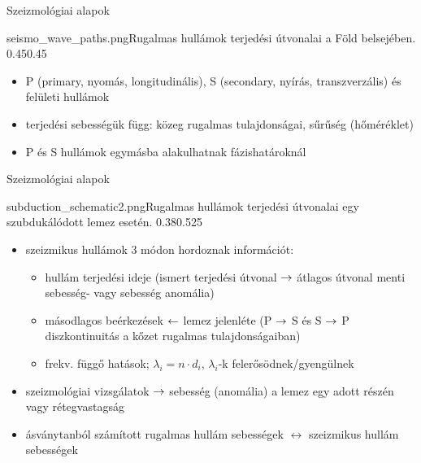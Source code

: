 \documentclass{beamer}
\begin{document}
\begin{frame}{Szeizmológiai alapok}
    \begin{figp}{seismo_wave_paths.png}{Rugalmas hullámok terjedési útvonalai a Föld belsejében. \cite{wysession}}{0.45}{0.45}
        \begin{itemize}
            \item P (primary, nyomás, longitudinális), S (secondary, nyírás, transzverzális) és felületi hullámok
            \item terjedési sebességük függ: közeg rugalmas tulajdonságai, sűrűség (hőméréklet)
            \item P és S hullámok egymásba alakulhatnak fázishatároknál
        \end{itemize}
    \end{figp}
\end{frame}


\begin{frame}{Szeizmológiai alapok}
    \begin{figp}{subduction_schematic2.png}{Rugalmas hullámok terjedési útvonalai egy szubdukálódott lemez esetén. \cite{helffrich}}{0.38}{0.525}
        \begin{itemize}
            \item szeizmikus hullámok 3 módon hordoznak információt:
            \begin{itemize}
                \item hullám terjedési ideje (ismert terjedési útvonal $\rightarrow$ átlagos útvonal menti sebesség- vagy sebesség anomália)
                \item másodlagos beérkezések $\leftarrow$ lemez jelenléte (P $\rightarrow$ S és S $\rightarrow$ P diszkontinuitás a kőzet rugalmas tulajdonságaiban)
                \item frekv. függő hatások; $\lambda_i = n \cdot d_i$, $\lambda_i$-k felerősödnek/gyengülnek
            \end{itemize}
            \item szeizmológiai vizsgálatok $\rightarrow$ sebesség (anomália) a lemez egy adott részén vagy rétegvastagság
            \item ásványtanból számított rugalmas hullám sebességek $\leftrightarrow$ szeizmikus hullám sebességek
        \end{itemize}
    \end{figp}
\end{frame}


\end{document}
